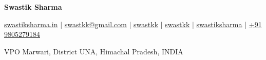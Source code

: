\documentclass[7pt, legalpaper]{article}
\begin{document}
\pagestyle{empty} 



\begin{center}
\huge {\textbf{Swastik Sharma}}
\end{center}


\begin{center}
\href{https://www.swastiksharma.in}{\raisebox{-0.05\height}{\faGlobe} swastiksharma.in} $|$ 
\href{mailto:swastkk@gmail.com}{\raisebox{-0.05\height}{\faEnvelope} swastkk@gmail.com} $|$ 
\href{https://github.com/swastkk}{\raisebox{-0.05\height}{\faGithub} swastkk} $|$ 
\href{https://linkedin.com/in/swastkk}{\raisebox{-0.05\height}{\faLinkedin} swastkk} $|$ 
\href{https://leetcode.com/swastiksharma}{\raisebox{-0.05\height}{\faCode} swastiksharma} $|$ 
\href{tel:+919805279184}{\raisebox{-0.05\height}{\faMobile} +91 9805279184}
\end{center}

\begin{center}
    \small VPO Marwari, District UNA, Himachal Pradesh, INDIA
\end{center}
\end{document}
